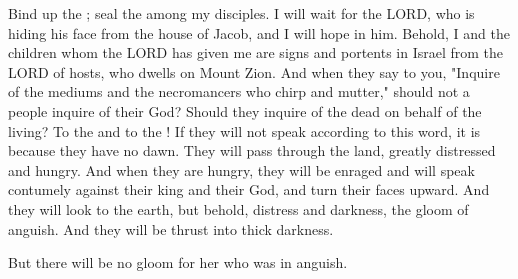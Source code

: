 \documentclass[11pt]{article}
\begin{document}
\begin{biblicaloutline}[Isaiah 8:16-9:1a]

    \begin{versesection}{2em}
         Bind up the ; seal the  among my disciples.  I will wait for the LORD, who is hiding his face from the house of Jacob, and I will hope in him.  Behold, I and the children whom the LORD has given me are signs and portents in Israel from the LORD of hosts, who dwells on Mount Zion.  And when they say to you, "Inquire of the mediums and the necromancers who chirp and mutter," should not a people inquire of their God? Should they inquire of the dead on behalf of the living?  To the  and to the ! If they will not speak according to this word, it is because they have no dawn.  They will pass through the land, greatly distressed and hungry. And when they are hungry, they will be enraged and will speak contumely against their king and their God, and turn their faces upward.  And they will look to the earth, but behold, distress and darkness, the gloom of anguish. And they will be thrust into thick darkness.
        
         But there will be no gloom for her who was in anguish.
    \end{versesection}

\end{biblicaloutline}
\end{document}
